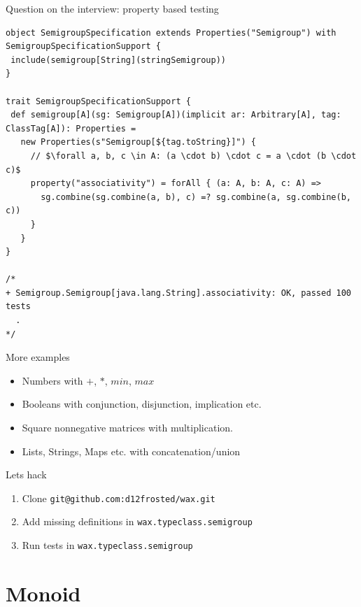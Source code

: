 \documentclass[presentation,aspectratio=169,smaller]{beamer}
\begin{document}
\begin{frame}[label={sec:org03e1c95},fragile]{Question on the interview: property based testing}
 \begin{verbatim}
object SemigroupSpecification extends Properties("Semigroup") with SemigroupSpecificationSupport {
 include(semigroup[String](stringSemigroup))
}

trait SemigroupSpecificationSupport {
 def semigroup[A](sg: Semigroup[A])(implicit ar: Arbitrary[A], tag: ClassTag[A]): Properties =
   new Properties(s"Semigroup[${tag.toString}]") {
     // $\forall a, b, c \in A: (a \cdot b) \cdot c = a \cdot (b \cdot c)$
     property("associativity") = forAll { (a: A, b: A, c: A) =>
       sg.combine(sg.combine(a, b), c) =? sg.combine(a, sg.combine(b, c))
     }
   }
}

/*
+ Semigroup.Semigroup[java.lang.String].associativity: OK, passed 100 tests
  .
*/
\end{verbatim}
\end{frame}

\begin{frame}[label={sec:orgdf832f5}]{More examples}
\begin{itemize}
\item Numbers with \(+\), \(*\), \(min\), \(max\)
\item Booleans with conjunction, disjunction, implication etc.
\item Square nonnegative matrices with multiplication.
\item Lists, Strings, Maps etc. with concatenation/union
\end{itemize}
\end{frame}

\begin{frame}[label={sec:org04c03f1},fragile]{Lets hack}
 \begin{enumerate}
\item Clone \texttt{git@github.com:d12frosted/wax.git}
\item Add missing definitions in \texttt{wax.typeclass.semigroup}
\item Run tests in \texttt{wax.typeclass.semigroup}
\end{enumerate}
\end{frame}

\section*{Monoid}
\label{sec:org8032507}
\end{document}
